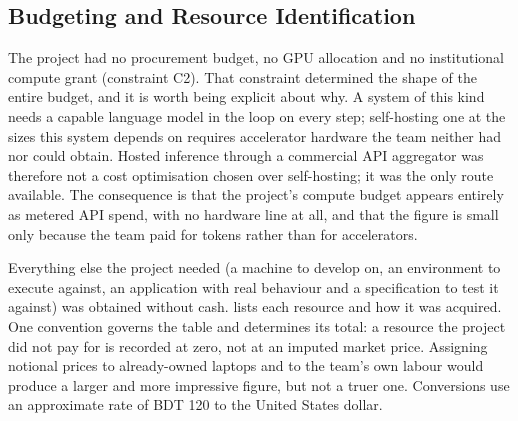 \subsection{Budgeting and Resource Identification}
\label{sec:budget}

The project had no procurement budget, no GPU allocation and no institutional
compute grant (constraint C2). That constraint determined the shape of the
entire budget, and it is worth being explicit about why. A system of this kind
needs a capable language model in the loop on every step; self-hosting one at
the sizes this system depends on requires accelerator hardware the team neither
had nor could obtain. Hosted inference through a commercial API aggregator was
therefore not a cost optimisation chosen over self-hosting; it was the only route available. The consequence is that the project's compute budget appears
entirely as metered API spend, with no hardware line at all, and that the
figure is small only because the team paid for tokens rather than for
accelerators.

Everything else the project needed (a machine to develop on, an environment to
execute against, an application with real behaviour and a specification to test
it against) was obtained without cash.  lists each
resource and how it was acquired. One convention governs the table and
determines its total: a resource the project did not pay for is recorded at
zero, not at an imputed market price. Assigning notional prices to
already-owned laptops and to the team's own labour would produce a larger and
more impressive figure, but not a truer one. Conversions use an approximate
rate of BDT 120 to the United States dollar.

